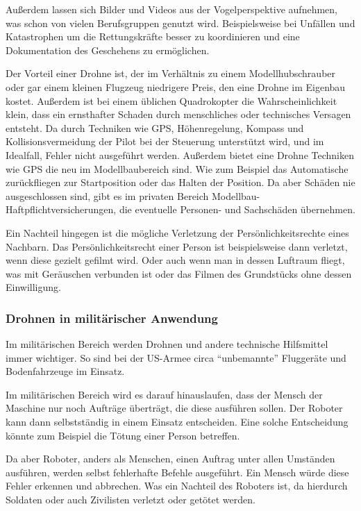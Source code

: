 Außerdem lassen sich Bilder und Videos aus der Vogelperspektive
aufnehmen, was schon von vielen Berufsgruppen genutzt wird.
Beispielsweise bei Unfällen und Katastrophen um die Rettungskräfte besser zu koordinieren
und eine Dokumentation des Geschehens zu ermöglichen.

\bigskip

Der Vorteil einer Drohne ist, der im Verhältnis zu einem Modellhubschrauber
oder gar einem kleinen Flugzeug niedrigere Preis,
den eine Drohne im Eigenbau kostet.
Außerdem ist bei einem üblichen Quadrokopter die Wahrscheinlichkeit klein,
dass ein ernsthafter Schaden durch menschliches oder technisches Versagen entsteht.
Da durch Techniken wie \ac{GPS}, Höhenregelung,
Kompass und Kollisionsvermeidung der Pilot bei der Steuerung unterstützt wird,
und im Idealfall, Fehler nicht ausgeführt werden.
Außerdem bietet eine Drohne Techniken wie \ac{GPS}
die neu im Modellbaubereich sind.
Wie zum Beispiel das Automatische zurückfliegen zur Startposition
oder das Halten der Position.
Da aber Schäden nie ausgeschlossen sind, gibt es im privaten
Bereich Modellbau-Haftpflichtversicherungen,
die eventuelle Personen- und Sachschäden übernehmen.

Ein Nachteil hingegen ist die mögliche Verletzung der
Persönlichkeitsrechte eines Nachbarn.
Das Persönlichkeitsrecht einer Person ist beispielsweise dann verletzt,
wenn diese gezielt gefilmt wird.
Oder auch wenn man in dessen Luftraum fliegt, was mit Geräuschen verbunden ist
oder das Filmen des Grundstücks ohne dessen Einwilligung.

\subsubsection{Drohnen in militärischer Anwendung}
\label{subsubsec:drohnen:AbwaegungderArgumente:Militaer}

Im militärischen Bereich werden Drohnen und andere technische
Hilfsmittel immer wichtiger.
So sind bei der US-Armee circa  \enquote{unbemannte} Fluggeräte
und  Bodenfahrzeuge im Einsatz.

Im militärischen Bereich wird es darauf hinauslaufen,
dass der Mensch der Maschine nur noch Aufträge überträgt,
die diese ausführen sollen.
Der Roboter kann dann selbstständig in einem Einsatz entscheiden.
Eine solche Entscheidung könnte zum Beispiel die
Tötung einer Person betreffen.

Da aber Roboter, anders als Menschen, einen Auftrag unter allen
Umständen ausführen, werden selbst fehlerhafte Befehle ausgeführt.
Ein Mensch würde diese Fehler erkennen und abbrechen.
Was ein Nachteil des Roboters ist, da hierdurch
Soldaten oder auch Zivilisten verletzt oder getötet werden.


